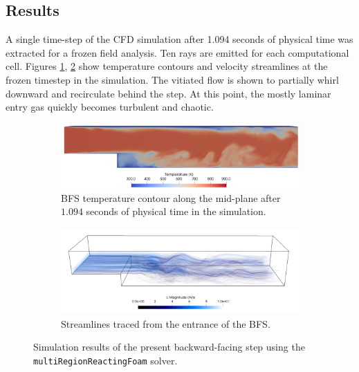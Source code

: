 \subsection{Results}
A single time-step of the CFD simulation after 1.094 seconds of physical time was extracted for a frozen field analysis. Ten rays are emitted for each computational cell.
Figures \ref{fig:BFS_temperature}, \ref{fig:BFS_streamlines} show temperature contours and velocity streamlines at the frozen timestep in the simulation. The vitiated flow is shown to partially whirl downward and recirculate behind the step. At this point, the mostly laminar entry gas quickly becomes turbulent and chaotic.

\begin{figure}
  \begin{subfigure}{1\textwidth}
  \includegraphics[width=\linewidth]{figures/ch4/BFS_temperature.png}
  \caption{BFS temperature contour along the mid-plane after $1.094$ seconds of physical time in the simulation. }
  \label{fig:BFS_temperature}
  \end{subfigure}
  \begin{subfigure}{1\textwidth}
  \includegraphics[width=\linewidth]{figures/ch4/BFS_streamlines6.png}
  \caption{Streamlines traced from the entrance of the BFS.}
  \label{fig:BFS_streamlines}
  \end{subfigure}
  \caption{Simulation results of the present backward-facing step using the \texttt{multiRegionReactingFoam} solver.}
  \label{fig:BFS_contours}
\end{figure}

